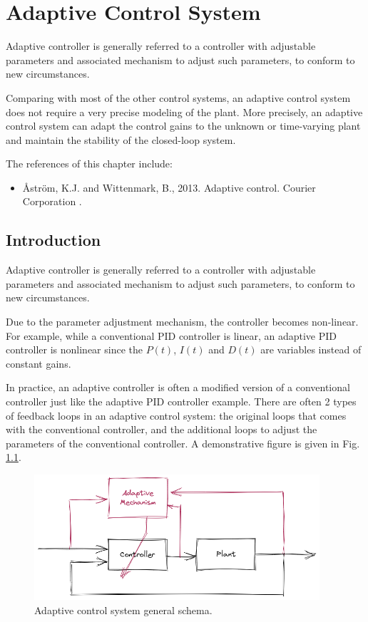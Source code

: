 \chapter{Adaptive Control System} \label{ch:acs}

Adaptive controller is generally referred to a controller with adjustable parameters and associated mechanism to adjust such parameters, to conform to new circumstances.

Comparing with most of the other control systems, an adaptive control system does not require a very precise modeling of the plant. More precisely, an adaptive control system can adapt the control gains to the unknown or time-varying plant and maintain the stability of the closed-loop system.

The references of this chapter include:
\begin{itemize}
	\item Åström, K.J. and Wittenmark, B., 2013. Adaptive control. Courier Corporation \cite{aastrom2013adaptive}.
\end{itemize}

\section{Introduction}

Adaptive controller is generally referred to a controller with adjustable parameters and associated mechanism to adjust such parameters, to conform to new circumstances.

Due to the parameter adjustment mechanism, the controller becomes non-linear. For example, while a conventional PID controller is linear, an adaptive PID controller is nonlinear since the $P(t)$, $I(t)$ and $D(t)$ are variables instead of constant gains.

In practice, an adaptive controller is often a modified version of a conventional controller just like the adaptive PID controller example. There are often 2 types of feedback loops in an adaptive control system: the original loops that comes with the conventional controller, and the additional loops to adjust the parameters of the conventional controller. A demonstrative figure is given in Fig. \ref{ch:acs:fig:adaptive_control_schema_general}.

\begin{figure}
	\centering
	\includegraphics[width=300pt]{chapters/ch-adaptive-control-system/figures/adaptive_control_schema_general.png}
	\caption{Adaptive control system general schema.} \label{ch:acs:fig:adaptive_control_schema_general}
\end{figure}

